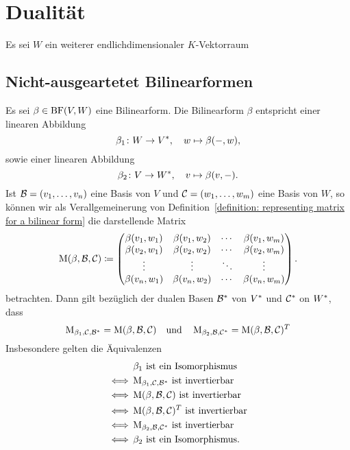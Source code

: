 \section{Dualität}

Es sei $W$ ein weiterer endlichdimensionaler $K$-Vektorraum



\subsection{Nicht-ausgeartetet Bilinearformen}

Es sei $\beta \in \operatorname{BF}(V, W)$ eine Bilinearform.
Die Bilinearform $\beta$ entspricht einer linearen Abbildung
\[
          \beta_1
  \colon  W
  \to     V^*,
  \quad
          w
  \mapsto \beta(-,w),
\]
sowie einer linearen Abbildung
\[
          \beta_2
  \colon  V
  \to     W^*,
  \quad
          v
  \mapsto \beta(v,-).
\]
Ist $\mathcal{B} = (v_1, \dotsc, v_n)$ eine Basis von $V$ und $\mathcal{C} = (w_1, \dotsc, w_m)$ eine Basis von $W$, so können wir als Verallgemeinerung von Definition~\ref{definition: representing matrix for a bilinear form} die darstellende Matrix
\[
            \operatorname{M}(\beta, \mathcal{B}, \mathcal{C})
  \coloneqq \begin{pmatrix}
              \beta(v_1, w_1) & \beta(v_1, w_2) & \cdots  & \beta(v_1, w_m) \\
              \beta(v_2, w_1) & \beta(v_2, w_2) & \cdots  & \beta(v_2, w_m) \\
              \vdots          & \vdots          & \ddots  & \vdots          \\
              \beta(v_n, w_1) & \beta(v_n, w_2) & \cdots  & \beta(v_n, w_m)
            \end{pmatrix}.
\]
betrachten.
Dann gilt bezüglich der dualen Basen $\mathcal{B}^*$ von $V^*$ und $\mathcal{C}^*$ on $W^*$, dass
\[
    \operatorname{M}_{\beta_1, \mathcal{C}, \mathcal{B}^*}
  = \operatorname{M}(\beta, \mathcal{B}, \mathcal{C})
  \quad\text{und}\quad
    \operatorname{M}_{\beta_2, \mathcal{B}, \mathcal{C}^*}
  = \operatorname{M}(\beta, \mathcal{B}, \mathcal{C}) ^T
\]
Insbesondere gelten die Äquivalenzen
\begin{align*}
      &\, \text{$\beta_1$ ist ein Isomorphismus}                                                \\
  \iff&\, \text{$\operatorname{M}_{\beta_1, \mathcal{C}, \mathcal{B}^*}$ ist invertierbar}         \\
  \iff&\, \text{$\operatorname{M}(\beta, \mathcal{B}, \mathcal{C})$ ist invertierbar}               \\
  \iff&\, \text{$\operatorname{M}(\beta, \mathcal{B}, \mathcal{C}) ^T$ ist invertierbar} \\
  \iff&\, \text{$\operatorname{M}_{\beta_2, \mathcal{B}, \mathcal{C}^*}$ ist invertierbar}         \\
  \iff&\, \text{$\beta_2$ ist ein Isomorphismus}.
\end{align*}

